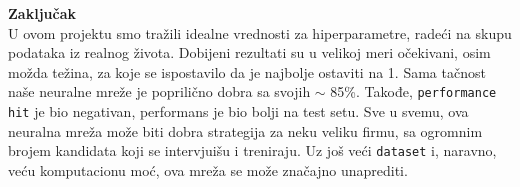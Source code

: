 \documentclass{article}
\providecommand{\inlinecode}[1]{\texttt{#1}}
\newenvironment{eComment}[2][Zaključak]
    { \begin{mdframed}[backgroundcolor=gray!40] \textbf{#1 #2} \\}
    {  \end{mdframed}}
\begin{document}
    \begin{eComment}{}
    U ovom projektu smo tražili idealne vrednosti za hiperparametre, radeći na skupu podataka iz realnog života. Dobijeni rezultati su u velikoj meri očekivani, osim možda težina, za koje se ispostavilo da je najbolje ostaviti na 1. Sama tačnost naše neuralne mreže je poprilično dobra sa svojih $\sim$  85\%. Takođe, \inlinecode{performance hit} je bio negativan, performans je bio bolji na test setu.
    Sve u svemu, ova neuralna mreža može biti dobra strategija za neku veliku firmu, sa ogromnim brojem kandidata koji se intervjuišu i treniraju. Uz još veći \inlinecode{dataset} i, naravno, veću komputacionu moć, ova mreža se može značajno unaprediti.
    \end{eComment}
    
\end{document}
